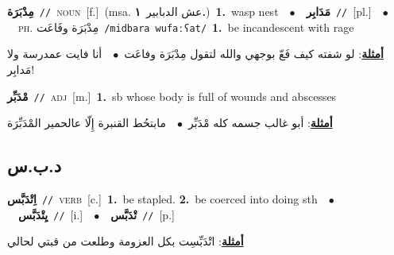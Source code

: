 \documentclass[10pt,a4paper,twoside]{article} %
\begin{document}
\begin{multicols}{2}
{{{{\setlength\topsep{0pt}\textbf{\foreignlanguage{arabic}{مِدْبَرَة}}\ {\color{gray}\texttt{//}\color{black}}\ \textsc{noun}\ [f.]\ \color{gray}(msa. \foreignlanguage{arabic}{عش الدبابير}~\foreignlanguage{arabic}{\textbf{١.}})\color{black}\ \textbf{1.}~wasp nest\ \ $\bullet$\ \ \setlength\topsep{0pt}\textbf{\foreignlanguage{arabic}{مَدَابِر}}\ {\color{gray}\texttt{//}\color{black}}\ [pl.]\ \ $\bullet$\ \ \textsc{ph.} \color{gray} \foreignlanguage{arabic}{مِدْبَرَة وفَاعَت}\color{black}\ {\color{gray}\texttt{/{\sffamily midbara wufaːʕat}/}\color{black}}\ \textbf{1.}~be incandescent with rage\  \begin{flushright}\color{gray}\foreignlanguage{arabic}{\textbf{\underline{\foreignlanguage{arabic}{أمثلة}}}: لو شفته كيف فَعّ بوجهي والله لتقول مِدْبَرَة وفاعَت\ $\bullet$\ \  أنا فايت عمدرسة ولا مَدابِر!}\end{flushright}\color{black}} \vspace{2mm}

{\setlength\topsep{0pt}\textbf{\foreignlanguage{arabic}{مْدَبِّر}}\ {\color{gray}\texttt{//}\color{black}}\ \textsc{adj}\ [m.]\ \textbf{1.}~sb whose body is full of wounds and abscesses\  \begin{flushright}\color{gray}\foreignlanguage{arabic}{\textbf{\underline{\foreignlanguage{arabic}{أمثلة}}}: أبو غالب جسمه كله مْدَبِّر\ $\bullet$\ \  مابتحُط القنبرة إِلّا عالحمير المْدَبِّرَة}\end{flushright}\color{black}} \vspace{2mm}

\vspace{-3mm}
\subsection*{\color{blue}\foreignlanguage{arabic}{د.ب.س}\color{blue}{}} 

{\setlength\topsep{0pt}\textbf{\foreignlanguage{arabic}{اِتْدَبَّس}}\ {\color{gray}\texttt{//}\color{black}}\ \textsc{verb}\ [c.]\ \textbf{1.}~be stapled.  \textbf{2.}~be coerced into doing sth\ \ $\bullet$\ \ \setlength\topsep{0pt}\textbf{\foreignlanguage{arabic}{يِتْدَبَّس}}\ {\color{gray}\texttt{//}\color{black}}\ [i.]\ \ $\bullet$\ \ \setlength\topsep{0pt}\textbf{\foreignlanguage{arabic}{تْدَبَّس}}\ {\color{gray}\texttt{//}\color{black}}\ [p.]\  \begin{flushright}\color{gray}\foreignlanguage{arabic}{\textbf{\underline{\foreignlanguage{arabic}{أمثلة}}}: اتْدَبِّسِت بكل العزومة وطلعت من قبتي لحالي}\end{flushright}\color{black}} \vspace{2mm}

}}}
\end{multicols}
\end{document}
